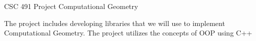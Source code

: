 CSC 491 Project Computational Geometry

The project includes developing libraries that we will use to implement Computational Geometry. The project utilizes the concepts of OOP using C++ 